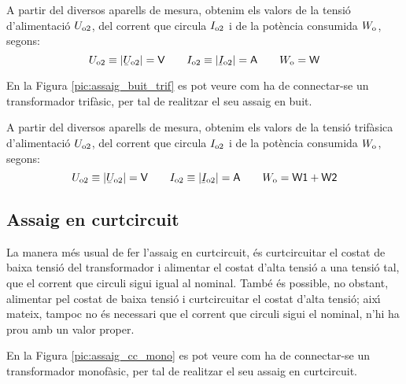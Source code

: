 A partir del diversos aparells de mesura, obtenim els valors de la
tensi\'{o} d'alimentaci\'{o} $U_\mathrm{o2}$, del corrent que circula
$I_\mathrm{o2}$ i de la pot\`{e}ncia consumida $W_\mathrm{o}$, segons:
\begin{equation}
    U\ped{o2}\equiv|\cmplx{U}\ped{o2}|=\textsf{V} \qquad
    I\ped{o2}\equiv|\cmplx{I}\ped{o2}|=\textsf{A}
    \qquad W\ped{o}=\textsf{W}
\end{equation}

En la Figura \vref{pic:assaig_buit_trif} es pot veure com ha de
connectar-se un transformador trif\`{a}sic, per tal de realitzar el seu
assaig en buit.

\begin{center}
    
    \label{pic:assaig_buit_trif}
\end{center}


A partir del diversos aparells de mesura, obtenim els valors de la
tensi\'{o} trif\`{a}sica d'alimentaci\'{o} $U_\mathrm{o2}$, del corrent que circula
$I_\mathrm{o2}$ i de la pot\`{e}ncia consumida $W_\mathrm{o}$, segons:
\begin{equation}
    U\ped{o2}\equiv|\cmplx{U}\ped{o2}|=\textsf{V} \qquad
    I\ped{o2}\equiv|\cmplx{I}\ped{o2}|=\textsf{A} \qquad
    W\ped{o}=\textsf{W1}+\textsf{W2}
\end{equation}

\subsection{Assaig en curtcircuit}

La manera m\'{e}s usual de fer l'assaig en curtcircuit, \'{e}s
curtcircuitar el costat de baixa tensi\'{o} del transformador i
alimentar el costat d'alta tensi\'{o} a  una tensi\'{o} tal, que el corrent
que circuli sigui igual al nominal. Tamb\'{e} \'{e}s possible, no obstant,
alimentar pel costat de baixa tensi\'{o} i curtcircuitar el costat
d'alta tensi\'{o}; aix\'{\i} mateix, tampoc no \'{e}s necessari que el corrent
que circuli sigui el nominal, n'hi ha prou amb un valor proper.

En la Figura \vref{pic:assaig_cc_mono} es pot veure com ha de
connectar-se un transformador monof\`{a}sic, per tal de realitzar el seu
assaig en curtcircuit.

\begin{center}
    
    \label{pic:assaig_cc_mono} \
\end{center}

